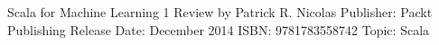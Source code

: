 


Scala for Machine Learning
  1 Review
by Patrick R. Nicolas
Publisher: Packt Publishing
Release Date: December 2014
ISBN: 9781783558742
Topic: Scala